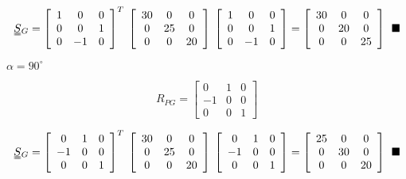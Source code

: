 \documentclass[onecolumn,11pt]{report}
\def\lthtmlcheckvsize{\ifdim\ht\sizebox<\vsize 
  \ifdim\wd\sizebox<\hsize\expandafter\hfill\fi \expandafter\vfill
  \else\expandafter\vss\fi}%
\begin{document}
{\newpage\clearpage
{}%
\begin{displaymath}\uuline{S}{}_G
=
\left[
\begin{array}{ccc}
1  & 0  & 0 \\
0  & 0  & 1 \\
0  & -1 & 0
\end{array}
\right]^T
\:
\left[
\begin{array}{ccc}
30 & 0  & 0 \\
0  & 25 & 0 \\
0  &  0 & 20
\end{array}
\right]
\:
\left[
\begin{array}{ccc}
1  & 0  & 0 \\
0  & 0  & 1 \\
0  & -1 & 0
\end{array}
\right]
=
\left[
\begin{array}{ccc}
30 & 0  & 0 \\
0  & 20 & 0 \\
0  &  0 & 25
\end{array}
\right]
\: \: \blacksquare\end{displaymath}%
\lthtmldisplayZ
\lthtmlcheckvsize\clearpage}

{\newpage\clearpage
{}%
$ \alpha = 90^{\circ}$%
\lthtmlindisplaymathZ
\lthtmlcheckvsize\clearpage}

{\newpage\clearpage
{}%
\begin{displaymath}R_{PG}
=
\left[
\begin{array}{ccc}
0  & 1  & 0 \\
-1 & 0  & 0 \\
0  & 0  & 1
\end{array}
\right]\end{displaymath}%
\lthtmldisplayZ
\lthtmlcheckvsize\clearpage}

{\newpage\clearpage
{}%
\begin{displaymath}\uuline{S}{}_G
=
\left[
\begin{array}{ccc}
0  & 1  & 0 \\
-1 & 0  & 0 \\
0  & 0  & 1
\end{array}
\right]^T
\:
\left[
\begin{array}{ccc}
30 & 0  & 0 \\
0  & 25 & 0 \\
0  &  0 & 20
\end{array}
\right]
\:
\left[
\begin{array}{ccc}
0  & 1  & 0 \\
-1 & 0  & 0 \\
0  & 0  & 1
\end{array}
\right]
=
\left[
\begin{array}{ccc}
25 & 0  & 0 \\
0  & 30 & 0 \\
0  &  0 & 20
\end{array}
\right]
\: \: \blacksquare\end{displaymath}%
\lthtmldisplayZ
\lthtmlcheckvsize\clearpage}
\end{document}
